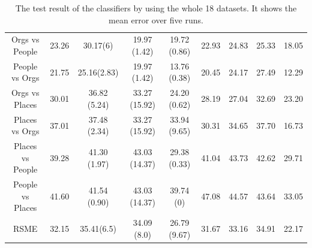 \begin{table}[h]
{\begin{tabular}{@{}ccccccccc@{}}
			Orgs vs People         & 23.26 & 30.17(6)   &  19.97 (1.42)	    & 19.72  (0.86)        & 22.93 & 24.83 & 25.33 & 18.05 \\
			People vs Orgs         & 21.75 & 25.16(2.83) & 19.97 (1.42)	    & 13.76 (0.38)         & 20.45 & 24.17 & 27.49 & 12.29 \\
			Orgs vs Places         & 30.01 & 36.82 (5.24)& 33.27 (15.92)    & 24.20  (0.62)        & 28.19 & 27.04 & 32.69 & 23.20 \\
			Places vs Orgs         & 37.01 & 37.48 (2.34)& 33.27 (15.92)    & 33.94  (9.65)        & 30.31 & 34.65 & 37.70 & 16.73 \\
			Places vs People       & 39.28 & 41.30 (1.97)& 43.03 (14.37)    & 29.38   (0.33)       & 41.04 & 43.73 & 42.62 & 29.71 \\
			People vs Places       & 41.60 & 41.54 (0.90)& 43.03 (14.37)    & 39.74    (0)      & 47.08 & 44.57 & 43.64 & 33.05 \\\midrule
			RSME                   & 32.15 & 35.41(6.5) & 34.09 (8.0)    & 26.79 (9.67)         & 31.67 & 33.16 & 34.91 & 22.17 \\ \bottomrule
	\end{tabular}}
	\caption[Complete Dataset Result of Error]{The test result of the classifiers by using the whole 18 datasets. It shows the mean error over five runs.\label{BTableCompleteErr}}
\end{table}

